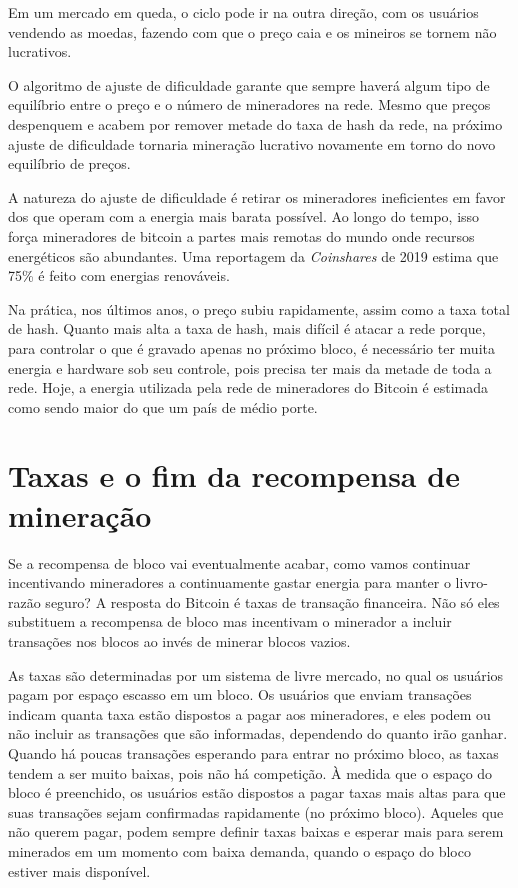 Em um mercado em queda, o ciclo pode ir na outra direção, com os usuários vendendo as moedas, fazendo com que o preço caia e os mineiros se tornem não lucrativos.

O algoritmo de ajuste de dificuldade garante que sempre haverá algum tipo de equilíbrio entre o preço e o número de mineradores na rede. 
Mesmo que preços despenquem e acabem por remover metade do taxa de hash da rede, na próximo ajuste de dificuldade tornaria mineração lucrativo novamente em torno do novo equilíbrio de preços.

A natureza do ajuste de dificuldade é retirar os mineradores ineficientes em favor dos que operam com a energia mais barata possível. 
Ao longo do tempo, isso força mineradores de bitcoin a partes mais remotas do mundo onde recursos energéticos são abundantes. 
Uma reportagem da \textit{Coinshares} de 2019 estima que 75\% é feito com energias renováveis.

Na prática, nos últimos anos, o preço subiu rapidamente, assim como a taxa total de hash. Quanto mais alta a taxa de hash, mais difícil é atacar a rede porque, para controlar o que é gravado apenas no próximo bloco, é necessário ter muita energia e hardware sob seu controle, pois precisa ter mais da metade de toda a rede. Hoje, a energia utilizada pela rede de mineradores do Bitcoin é estimada como sendo maior do que um país de médio porte.


\section*{Taxas e o fim da recompensa de mineração} 

Se a recompensa de bloco vai eventualmente acabar, como vamos continuar incentivando mineradores a continuamente gastar energia para manter o livro-razão seguro?
A resposta do Bitcoin é taxas de transação financeira.
Não só eles substituem a recompensa de bloco mas incentivam o minerador a incluir transações nos blocos ao invés de minerar blocos vazios.

As taxas são determinadas por um sistema de livre mercado, no qual os usuários pagam por espaço escasso em um bloco. Os usuários que enviam transações indicam quanta taxa estão dispostos a pagar aos mineradores, e eles podem ou não incluir as transações que são informadas, dependendo do quanto irão ganhar. Quando há poucas transações esperando para entrar no próximo bloco, as taxas tendem a ser muito baixas, pois não há competição. À medida que o espaço do bloco é preenchido, os usuários estão dispostos a pagar taxas mais altas para que suas transações sejam confirmadas rapidamente (no próximo bloco). Aqueles que não querem pagar, podem sempre definir taxas baixas e esperar mais para serem minerados em um momento com baixa demanda, quando o espaço do bloco estiver mais disponível.

